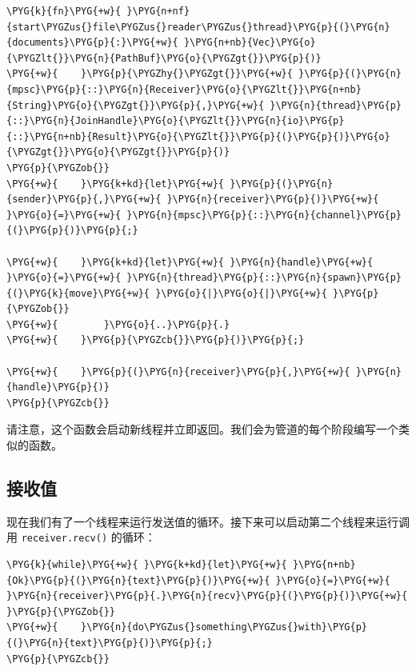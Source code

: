 \begin{Verbatim}[commandchars=\\\{\},breaklines=true,breakanywhere=true,fontsize=\codefont,xleftmargin=17bp]
\PYG{k}{fn}\PYG{+w}{ }\PYG{n+nf}{start\PYGZus{}file\PYGZus{}reader\PYGZus{}thread}\PYG{p}{(}\PYG{n}{documents}\PYG{p}{:}\PYG{+w}{ }\PYG{n+nb}{Vec}\PYG{o}{\PYGZlt{}}\PYG{n}{PathBuf}\PYG{o}{\PYGZgt{}}\PYG{p}{)}
\PYG{+w}{    }\PYG{p}{\PYGZhy{}\PYGZgt{}}\PYG{+w}{ }\PYG{p}{(}\PYG{n}{mpsc}\PYG{p}{::}\PYG{n}{Receiver}\PYG{o}{\PYGZlt{}}\PYG{n+nb}{String}\PYG{o}{\PYGZgt{}}\PYG{p}{,}\PYG{+w}{ }\PYG{n}{thread}\PYG{p}{::}\PYG{n}{JoinHandle}\PYG{o}{\PYGZlt{}}\PYG{n}{io}\PYG{p}{::}\PYG{n+nb}{Result}\PYG{o}{\PYGZlt{}}\PYG{p}{(}\PYG{p}{)}\PYG{o}{\PYGZgt{}}\PYG{o}{\PYGZgt{}}\PYG{p}{)}
\PYG{p}{\PYGZob{}}
\PYG{+w}{    }\PYG{k+kd}{let}\PYG{+w}{ }\PYG{p}{(}\PYG{n}{sender}\PYG{p}{,}\PYG{+w}{ }\PYG{n}{receiver}\PYG{p}{)}\PYG{+w}{ }\PYG{o}{=}\PYG{+w}{ }\PYG{n}{mpsc}\PYG{p}{::}\PYG{n}{channel}\PYG{p}{(}\PYG{p}{)}\PYG{p}{;}

\PYG{+w}{    }\PYG{k+kd}{let}\PYG{+w}{ }\PYG{n}{handle}\PYG{+w}{ }\PYG{o}{=}\PYG{+w}{ }\PYG{n}{thread}\PYG{p}{::}\PYG{n}{spawn}\PYG{p}{(}\PYG{k}{move}\PYG{+w}{ }\PYG{o}{|}\PYG{o}{|}\PYG{+w}{ }\PYG{p}{\PYGZob{}}
\PYG{+w}{        }\PYG{o}{..}\PYG{p}{.}
\PYG{+w}{    }\PYG{p}{\PYGZcb{}}\PYG{p}{)}\PYG{p}{;}

\PYG{+w}{    }\PYG{p}{(}\PYG{n}{receiver}\PYG{p}{,}\PYG{+w}{ }\PYG{n}{handle}\PYG{p}{)}
\PYG{p}{\PYGZcb{}}
\end{Verbatim}

请注意，这个函数会启动新线程并立即返回。我们会为管道的每个阶段编写一个类似的函数。

\subsection{接收值}

现在我们有了一个线程来运行发送值的循环。接下来可以启动第二个线程来运行调用 \texttt{receiver.recv()} 的循环：

\begin{Verbatim}[commandchars=\\\{\},breaklines=true,breakanywhere=true,fontsize=\codefont,xleftmargin=17bp]
\PYG{k}{while}\PYG{+w}{ }\PYG{k+kd}{let}\PYG{+w}{ }\PYG{n+nb}{Ok}\PYG{p}{(}\PYG{n}{text}\PYG{p}{)}\PYG{+w}{ }\PYG{o}{=}\PYG{+w}{ }\PYG{n}{receiver}\PYG{p}{.}\PYG{n}{recv}\PYG{p}{(}\PYG{p}{)}\PYG{+w}{ }\PYG{p}{\PYGZob{}}
\PYG{+w}{    }\PYG{n}{do\PYGZus{}something\PYGZus{}with}\PYG{p}{(}\PYG{n}{text}\PYG{p}{)}\PYG{p}{;}
\PYG{p}{\PYGZcb{}}
\end{Verbatim}

